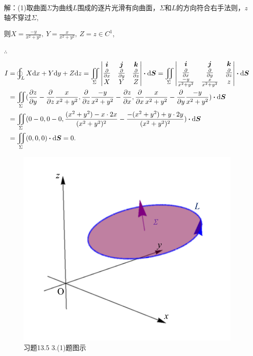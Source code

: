 \documentclass[12pt,UTF8]{ctexart}
\newcommand{\BLOInt}[2]{\varoint\nolimits_{#1}#2}
\newcommand{\md}[1]{\mathrm d#1}
\newcommand{\BSIInt}[2]{\iint\limits_{#1}#2}
\begin{document}
\begin{enumerate}
解：(1)取曲面$\Sigma$为曲线$L$围成的逐片光滑有向曲面，$\Sigma$和$L$的方向符合右手法则，$z$轴不穿过$\Sigma$,

则$X=\frac{-y}{x^2+y^2},\ Y=\frac x{x^2+y^2},\ Z=z\in C^1$,

$\therefore$
\[\begin{aligned}
I&=\BLOInt L{X\md x+Y\md y+Z\md z}=\BSIInt\Sigma{\begin{vmatrix}
\bm i&\bm j&\bm k\\
\frac\partial{\partial x}&\frac\partial{\partial y}&\frac\partial{\partial z}\\
X&Y&Z
\end{vmatrix}}\bm\cdot\md\bm S=\BSIInt\Sigma{\begin{vmatrix}
\bm i&\bm j&\bm k\\
\frac\partial{\partial x}&\frac\partial{\partial y}&\frac\partial{\partial z}\\
\frac{-y}{x^2+y^2}&\frac x{x^2+y^2}&z
\end{vmatrix}}\bm\cdot\md\bm S\\
&=\BSIInt\Sigma{(\frac{\partial z}{\partial y}-\frac\partial{\partial z}\frac x{x^2+y^2},\frac\partial{\partial z}\frac{-y}{x^2+y^2}-\frac{\partial z}{\partial x},\frac\partial{\partial x}\frac x{x^2+y^2}-\frac\partial{\partial y}\frac{-y}{x^2+y^2})\bm\cdot\md\bm S}\\
&=\BSIInt\Sigma{(0-0,0-0,\frac{(x^2+y^2)-x\cdot2x}{(x^2+y^2)^2}-\frac{-(x^2+y^2)+y\cdot2y}{(x^2+y^2)^2})\bm\cdot\md\bm S}\\
&=\BSIInt\Sigma{(0,0,0)\bm\cdot\md\bm S}=0.
\end{aligned}\]
\begin{figure}[H]
\begin{center}
\includegraphics[height=0.5\textheight]{Figures24/Fig13-5-3-1.pdf}
\end{center}
\caption{习题13.5 3.(1)题图示}
\label{13-5-3-1}
\end{figure}


\end{enumerate}
\end{document}
